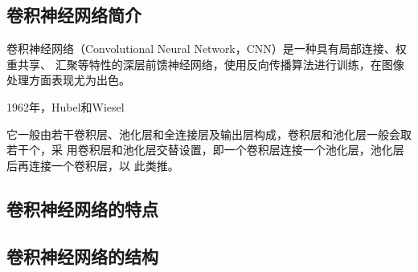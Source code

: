   \subsection{\hei\xiaosan\textbf{卷积神经网络简介}}
    卷积神经网络（Convolutional Neural Network，CNN）是一种具有局部连接、权重共享、
    汇聚等特性的深层前馈神经网络，使用反向传播算法进行训练，在图像处理方面表现尤为出色。

    1962年，Hubel和Wiesel

    它一般由若干卷积层、池化层和全连接层及输出层构成，卷积层和池化层一般会取若干个，采
    用卷积层和池化层交替设置，即一个卷积层连接一个池化层，池化层后再连接一个卷积层，以
    此类推。


  \subsection{\hei\xiaosan\textbf{卷积神经网络的特点}}
  
  \subsection{\hei\xiaosan\textbf{卷积神经网络的结构}}
